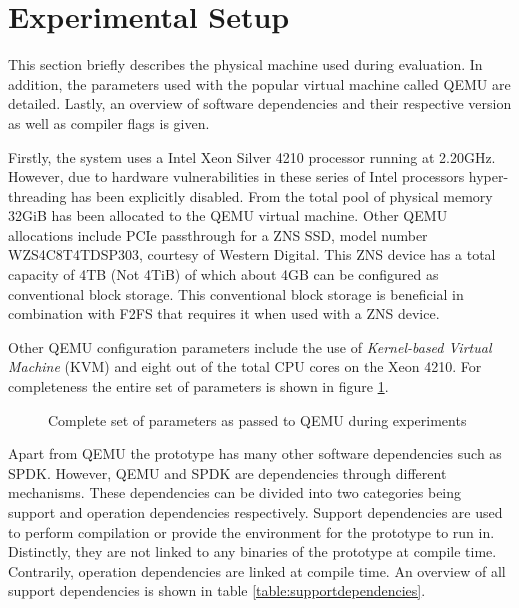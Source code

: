 \section{Experimental Setup}

This section briefly describes the physical machine used during evaluation.
In addition, the parameters used with the popular virtual machine called QEMU
\cite{qemu} are detailed. Lastly, an overview of software dependencies and their
respective version as well as compiler flags is given.

Firstly, the system uses a Intel Xeon Silver 4210 processor running at 2.20GHz.
However, due to hardware vulnerabilities in these series of Intel processors
hyper-threading has been explicitly disabled. From the total pool of physical
memory 32GiB has been allocated to the QEMU virtual machine. Other QEMU
allocations include PCIe passthrough for a ZNS SSD, model number
WZS4C8T4TDSP303, courtesy of Western Digital. This ZNS device has a total
capacity of 4TB (Not 4TiB) of which about 4GB can be configured as conventional
block storage. This conventional block storage is beneficial in combination with
F2FS that requires it when used with a ZNS device.

Other QEMU configuration parameters include the use of
\textit{Kernel-based Virtual Machine} (KVM) \cite{kvm} and eight out of the
total CPU cores on the Xeon 4210. For completeness the entire set of parameters
is shown in figure \ref{figure:qemuparameters}.

\begin{figure}
    \centering
	\caption{Complete set of parameters as passed to QEMU during experiments}
    \label{figure:qemuparameters}
\end{figure}

Apart from QEMU the prototype has many other software dependencies such as SPDK.
However, QEMU and SPDK are dependencies through different mechanisms. These
dependencies can be divided into two categories being support and operation
dependencies respectively. Support dependencies are used to perform compilation
or provide the environment for the prototype to run in. Distinctly, they are not
linked to any binaries of the prototype at compile time. Contrarily, operation
dependencies are linked at compile time. An overview of all support dependencies
is shown in table \ref{table:supportdependencies}.

